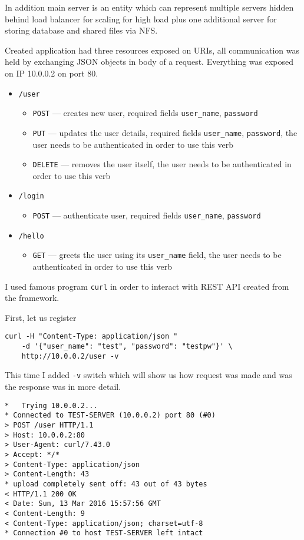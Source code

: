 In addition main server is an entity which can represent multiple servers hidden behind load balancer for scaling for high load plus one additional server for storing database and shared files via NFS\@.

Created application had three resources exposed on URIs, all communication was held by exchanging JSON objects in body of a request. Everything was exposed on IP 10.0.0.2 on port 80.
\begin{itemize}
    \item \verb|/user|
    \begin{itemize}
        \item \verb|POST| --- creates new user, required fields \verb|user_name|, \verb|password|
        \item \verb|PUT| --- updates the user details, required fields \verb|user_name|, \verb|password|, the user needs to be authenticated in order to use this verb
        \item \verb|DELETE| --- removes the user itself, the user needs to be authenticated in order to use this verb
    \end{itemize}
    \item \verb|/login|
    \begin{itemize}
        \item \verb|POST| --- authenticate user, required fields \verb|user_name|, \verb|password|
    \end{itemize}
    \item \verb|/hello|
    \begin{itemize}
        \item \verb|GET| --- greets the user using its \verb|user_name| field, the user needs to be authenticated in order to use this verb
    \end{itemize}
\end{itemize}

I used famous program \verb|curl| in order to interact with REST API created from the framework.

First, let us register
\begin{verbatim}
curl -H "Content-Type: application/json "
    -d '{"user_name": "test", "password": "testpw"}' \
    http://10.0.0.2/user -v
\end{verbatim}

This time I added \verb|-v| switch which will show us how request was made and was the response was in more detail.
\begin{verbatim}
*   Trying 10.0.0.2...
* Connected to TEST-SERVER (10.0.0.2) port 80 (#0)
> POST /user HTTP/1.1
> Host: 10.0.0.2:80
> User-Agent: curl/7.43.0
> Accept: */*
> Content-Type: application/json
> Content-Length: 43
* upload completely sent off: 43 out of 43 bytes
< HTTP/1.1 200 OK
< Date: Sun, 13 Mar 2016 15:57:56 GMT
< Content-Length: 9
< Content-Type: application/json; charset=utf-8
* Connection #0 to host TEST-SERVER left intact
\end{verbatim}

